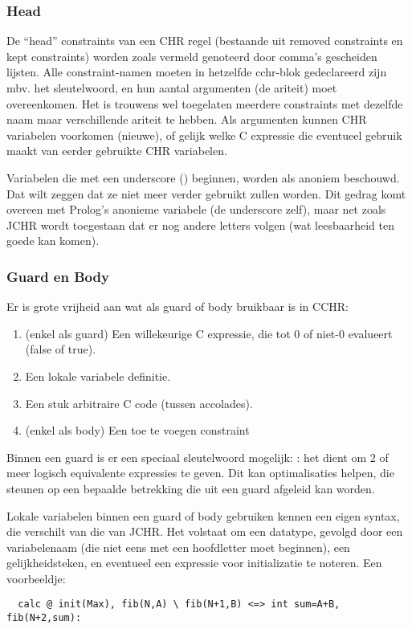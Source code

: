\subsubsection{Head}

De ``head'' constraints van een CHR regel (bestaande uit removed constraints en kept constraints) worden zoals vermeld genoteerd door comma's gescheiden lijsten. Alle constraint-namen moeten in hetzelfde cchr-blok gedeclareerd zijn mbv. het  sleutelwoord, en hun aantal argumenten (de ariteit) moet overeenkomen. Het is trouwens wel toegelaten meerdere constraints met dezelfde naam maar verschillende ariteit te hebben. Als argumenten kunnen CHR variabelen voorkomen (nieuwe), of gelijk welke C expressie die eventueel gebruik maakt van eerder gebruikte CHR variabelen. 

Variabelen die met een underscore (\code{\_}) beginnen, worden als anoniem beschouwd. Dat wilt zeggen dat ze niet meer verder gebruikt zullen worden. Dit gedrag komt overeen met Prolog's anonieme variabele (de underscore zelf), maar net zoals JCHR wordt toegestaan dat er nog andere letters volgen (wat leesbaarheid ten goede kan komen).

\subsubsection{Guard en Body}

Er is grote vrijheid aan wat als guard of body bruikbaar is in CCHR: \begin{enumerate}
  \item (enkel als guard) Een willekeurige C expressie, die tot 0 of niet-0 evalueert (false of true).
  \item Een lokale variabele definitie.
  \item Een stuk arbitraire C code (tussen accolades).
  \item (enkel als body) Een toe te voegen constraint
\end{enumerate}

Binnen een guard is er een speciaal sleutelwoord mogelijk: : het dient om 2 of meer logisch equivalente expressies te geven. Dit kan optimalisaties helpen, die steunen op een bepaalde betrekking die uit een guard afgeleid kan worden.

Lokale variabelen binnen een guard of body gebruiken kennen een eigen syntax, die verschilt van die van JCHR. Het volstaat om een datatype, gevolgd door een variabelenaam (die niet eens met een hoofdletter moet beginnen), een gelijkheidsteken, en eventueel een expressie voor initializatie te noteren. Een voorbeeldje: \begin{Verbatim}
  calc @ init(Max), fib(N,A) \ fib(N+1,B) <=> int sum=A+B, fib(N+2,sum):
\end{Verbatim}

